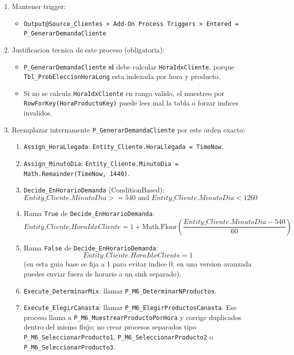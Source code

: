 \documentclass[11pt]{article}
\newcommand{\simio}[1]{\texttt{#1}}
\newcommand{\tabla}[1]{\texttt{#1}}
\newcommand{\state}[1]{\texttt{#1}}
\newcommand{\proc}[1]{\texttt{#1}}
\begin{document}
\begin{enumerate}
  \item Mantener trigger:
  \begin{itemize}
    \item \simio{Output@Source\_Clientes > Add-On Process Triggers > Entered = P\_GenerarDemandaCliente}
  \end{itemize}
  \item Justificacion tecnica de este proceso (obligatoria):
  \begin{itemize}
    \item \proc{P\_GenerarDemandaCliente} \textbf{si} debe calcular \state{HoraIdxCliente}, porque \tabla{Tbl\_ProbEleccionHoraLong} esta indexada por hora y producto.
    \item Si no se calcula \state{HoraIdxCliente} en rango valido, el muestreo por \state{RowForKey(HoraProductoKey)} puede leer mal la tabla o forzar indices invalidos.
  \end{itemize}
  \item Reemplazar internamente \proc{P\_GenerarDemandaCliente} por este orden exacto:
  \begin{enumerate}
    \item \simio{Assign\_HoraLlegada}: \state{Entity\_Cliente.HoraLlegada = TimeNow}.
    \item \simio{Assign\_MinutoDia}: \state{Entity\_Cliente.MinutoDia = Math.Remainder(TimeNow, 1440)}.
    \item \simio{Decide\_EnHorarioDemanda} (ConditionBased):
    \[
    Entity\_Cliente.MinutoDia >= 540 \text{ and } Entity\_Cliente.MinutoDia < 1260
    \]
    \item Rama \simio{True} de \simio{Decide\_EnHorarioDemanda}:
    \[
    Entity\_Cliente.HoraIdxCliente = 1 + \text{Math.Floor}\left(\frac{Entity\_Cliente.MinutoDia - 540}{60}\right)
    \]
    \item Rama \simio{False} de \simio{Decide\_EnHorarioDemanda}:
    \[
    Entity\_Cliente.HoraIdxCliente = 1
    \]
    (en esta guia base se fija a 1 para evitar indice 0; en una version avanzada puedes enviar fuera de horario a un sink separado).
    \item \simio{Execute\_DeterminarMix}: llamar \proc{P\_M6\_DeterminarNProductos}.
    \item \simio{Execute\_ElegirCanasta}: llamar \proc{P\_M6\_ElegirProductosCanasta}. Ese proceso llama a \proc{P\_M6\_MuestrearProductoPorHora} y corrige duplicados dentro del mismo flujo; no crear procesos separados tipo \proc{P\_M6\_SeleccionarProducto1}, \proc{P\_M6\_SeleccionarProducto2} o \proc{P\_M6\_SeleccionarProducto3}.

\end{enumerate}
\end{enumerate}
\end{document}
